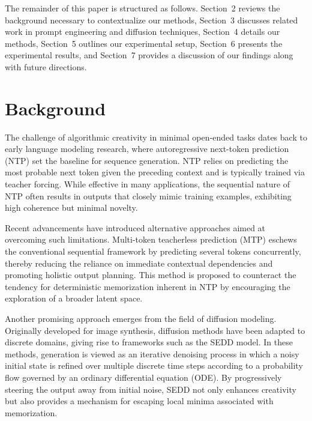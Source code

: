 \documentclass[12pt]{article}
\begin{document}
The remainder of this paper is structured as follows. Section~2 reviews the background necessary to contextualize our methods, Section~3 discusses related work in prompt engineering and diffusion techniques, Section~4 details our methods, Section~5 outlines our experimental setup, Section~6 presents the experimental results, and Section~7 provides a discussion of our findings along with future directions.

\section{Background}
The challenge of algorithmic creativity in minimal open‐ended tasks dates back to early language modeling research, where autoregressive next-token prediction (NTP) set the baseline for sequence generation. NTP relies on predicting the most probable next token given the preceding context and is typically trained via teacher forcing. While effective in many applications, the sequential nature of NTP often results in outputs that closely mimic training examples, exhibiting high coherence but minimal novelty.

Recent advancements have introduced alternative approaches aimed at overcoming such limitations. Multi-token teacherless prediction (MTP) eschews the conventional sequential framework by predicting several tokens concurrently, thereby reducing the reliance on immediate contextual dependencies and promoting holistic output planning. This method is proposed to counteract the tendency for deterministic memorization inherent in NTP by encouraging the exploration of a broader latent space.

Another promising approach emerges from the field of diffusion modeling. Originally developed for image synthesis, diffusion methods have been adapted to discrete domains, giving rise to frameworks such as the SEDD model. In these methods, generation is viewed as an iterative denoising process in which a noisy initial state is refined over multiple discrete time steps according to a probability flow governed by an ordinary differential equation (ODE). By progressively steering the output away from initial noise, SEDD not only enhances creativity but also provides a mechanism for escaping local minima associated with memorization.
\end{document}
